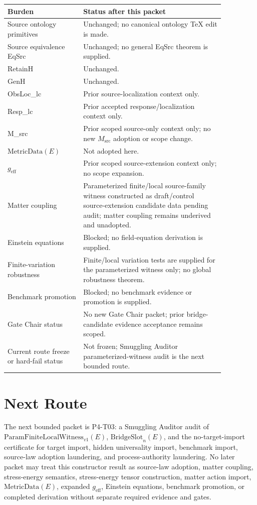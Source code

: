 \documentclass[11pt]{article}
\newcommand{\MetricData}{\mathrm{MetricData}}
\newcommand{\geff}{g_{\mathrm{eff}}}
\newcommand{\Msrc}{M_{\mathrm{src}}}
\newcommand{\PFLFW}{\mathrm{ParamFiniteLocalWitness}_{v1}}
\newcommand{\BridgeSlot}{\mathrm{BridgeSlot}}
\begin{document}
\begin{longtable}{p{0.30\linewidth}p{0.56\linewidth}}
\toprule
Burden & Status after this packet \\
\midrule
Source ontology primitives & Unchanged; no canonical ontology TeX edit is made. \\
Source equivalence EqSrc & Unchanged; no general EqSrc theorem is supplied. \\
RetainH & Unchanged. \\
GenH & Unchanged. \\
ObsLoc_lc & Prior source-localization context only. \\
Resp_lc & Prior accepted response/localization context only. \\
M_src & Prior scoped source-only context only; no new \(\Msrc\) adoption or scope change. \\
\(\MetricData(E)\) & Not adopted here. \\
\(\geff\) & Prior scoped source-extension context only; no scope expansion. \\
Matter coupling & Parameterized finite/local source-family witness constructed as draft/control source-extension candidate data pending audit; matter coupling remains underived and unadopted. \\
Einstein equations & Blocked; no field-equation derivation is supplied. \\
Finite-variation robustness & Finite/local variation tests are supplied for the parameterized witness only; no global robustness theorem. \\
Benchmark promotion & Blocked; no benchmark evidence or promotion is supplied. \\
Gate Chair status & No new Gate Chair packet; prior bridge-candidate evidence acceptance remains scoped. \\
Current route freeze or hard-fail status & Not frozen; Smuggling Auditor parameterized-witness audit is the next bounded route. \\
\bottomrule
\end{longtable}

\section{Next Route}

The next bounded packet is P4-T03: a Smuggling Auditor audit of
\(\PFLFW(E)\), \(\BridgeSlot_n(E)\), and the no-target-import certificate for
target import, hidden universality import, benchmark import, source-law
adoption laundering, and process-authority laundering. No later packet may
treat this constructor result as source-law adoption, matter coupling,
stress-energy semantics, stress-energy tensor construction, matter action
import, \(\MetricData(E)\), expanded \(\geff\), Einstein equations, benchmark
promotion, or completed derivation without separate required evidence and
gates.
\end{document}
